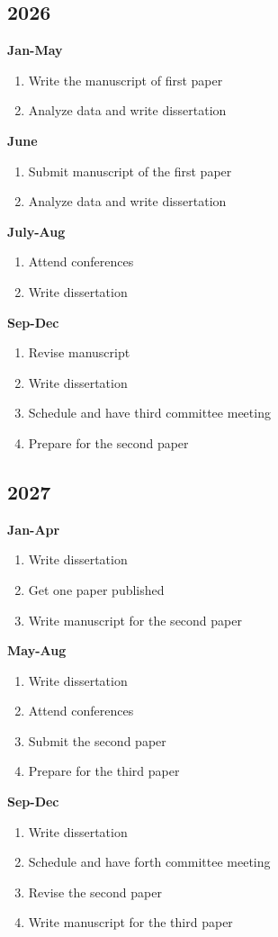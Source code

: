 \documentclass[12pt,letter]{article}
\begin{document}
\begin{multicols}{2}
\subsection{2026}
\textbf{Jan-May}
\begin{enumerate}
	\item Write the manuscript of first paper
	\item Analyze data and write dissertation
	\end{enumerate}	
\textbf{June}
\begin{enumerate}
	\item Submit manuscript of the first paper
	\item Analyze data and write dissertation
	\end{enumerate}	
\textbf{July-Aug}
\begin{enumerate}
	\item Attend conferences
	\item Write dissertation
	\end{enumerate}
\textbf{Sep-Dec}
\begin{enumerate}
	\item Revise manuscript
	\item Write dissertation
	\item Schedule and have third committee meeting
	\item Prepare for the second paper
	\end{enumerate}			
\subsection{2027}
\textbf{Jan-Apr}
\begin{enumerate}
	\item Write dissertation
	\item Get one paper published
	\item Write manuscript for the second paper
	\end{enumerate}	
\textbf{May-Aug}
\begin{enumerate}
	\item Write dissertation
	\item Attend conferences
	\item Submit the second paper
	\item Prepare for the third paper
	\end{enumerate}
\textbf{Sep-Dec}
\begin{enumerate}
	\item Write dissertation
	\item Schedule and have forth committee meeting
	\item Revise the second paper
	\item Write manuscript for the third paper
	\end{enumerate}		

\end{multicols}
\end{document}

